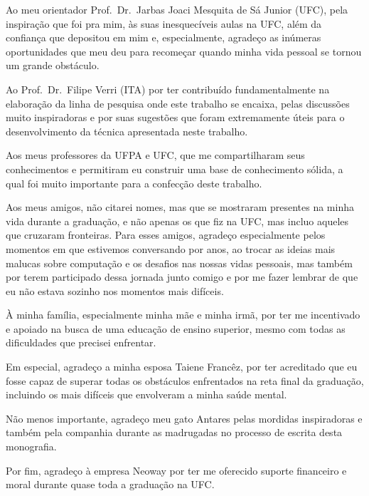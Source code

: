 Ao meu orientador Prof.\ Dr.\ Jarbas Joaci Mesquita de Sá Junior
(UFC), pela inspiração que foi pra mim, às suas inesquecíveis aulas na
UFC, além da confiança que depositou em mim e, especialmente, agradeço
as inúmeras oportunidades que meu deu para recomeçar quando minha vida
pessoal se tornou um grande obstáculo.

Ao Prof.\ Dr.\ Filipe Verri (ITA) por ter contribuído fundamentalmente
na elaboração da linha de pesquisa onde este trabalho se encaixa,
pelas discussões muito inspiradoras e por suas sugestões que foram
extremamente úteis para o desenvolvimento da técnica apresentada neste
trabalho.

Aos meus professores da UFPA e UFC, que me compartilharam seus
conhecimentos e permitiram eu construir uma base de conhecimento
sólida, a qual foi muito importante para a confecção deste trabalho.

Aos meus amigos, não citarei nomes, mas que se mostraram presentes na
minha vida durante a graduação, e não apenas os que fiz na UFC, mas
incluo aqueles que cruzaram fronteiras. Para esses amigos, agradeço
especialmente pelos momentos em que estivemos conversando por anos, ao
trocar as ideias mais malucas sobre computação e os desafios nas
nossas vidas pessoais, mas também por terem participado dessa jornada
junto comigo e por me fazer lembrar de que eu não estava sozinho nos
momentos mais difíceis.

À minha família, especialmente minha mãe e minha irmã, por ter me
incentivado e apoiado na busca de uma educação de ensino superior, mesmo
com todas as dificuldades que precisei enfrentar.

Em especial, agradeço a minha esposa Taiene Francêz, por ter
acreditado que eu fosse capaz de superar todas os obstáculos
enfrentados na reta final da graduação, incluindo os mais difíceis que
envolveram a minha saúde mental.

Não menos importante, agradeço meu gato Antares pelas mordidas
inspiradoras e também pela companhia durante as madrugadas no processo
de escrita desta monografia.

Por fim, agradeço à empresa Neoway por ter me oferecido suporte financeiro e moral
durante quase toda a graduação na UFC.\@
